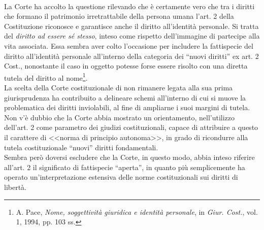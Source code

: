 \\La Corte ha accolto la questione rilevando che è certamente vero che tra i diritti che formano il patrimonio irretrattabile della persona umana l'art. 2 della Costituzione riconosce e garantisce anche il diritto all'identità personale. Si tratta del\textit{ diritto ad essere sé stesso}, inteso come rispetto dell'immagine di partecipe alla vita associata.
Essa sembra aver colto l’occasione per includere la fattispecie del diritto all'identità personale all’interno della categoria dei “nuovi diritti” ex art. 2 Cost., nonostante il caso in oggetto potesse forse essere risolto con una diretta tutela del diritto al nome\footnote{A. Pace, \textit{Nome, soggettività giuridica e identità personale}, in \textit{Giur. Cost.}, vol. 1, 1994, pp. 103 ss.}.
\\La scelta della Corte costituzionale di non rimanere legata alla sua prima giurisprudenza ha contribuito a delineare schemi all'interno di cui si muove la problematica dei diritti inviolabili, al fine di ampliarne i suoi margini di tutela. 
\\Non v’è dubbio che la Corte abbia mostrato un orientamento, nell’utilizzo dell’art. 2 come parametro dei giudizi costituzionali, capace di attribuire a questo il carattere di <<norma di principio autonoma>>, in grado di ricondurre alla tutela costituzionale “nuovi” diritti fondamentali. 
\\Sembra però doversi escludere che la Corte, in questo modo, abbia inteso riferire all’art. 2 il significato di fattispecie “aperta”, in quanto più semplicemente ha operato un’interpretazione estensiva delle norme costituzionali sui diritti di libertà.


